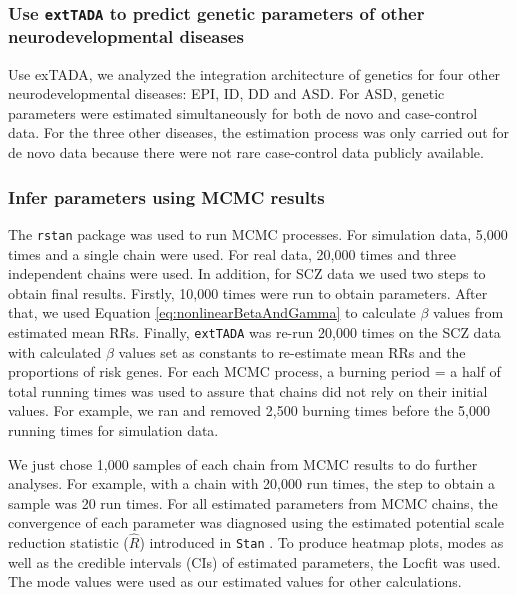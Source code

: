 \documentclass[]{article}
\begin{document}
\subsubsection{Use \texttt{extTADA} to predict genetic parameters of other  neurodevelopmental diseases}

Use exTADA, we analyzed the integration architecture of genetics for
four other  neurodevelopmental diseases: EPI, ID, DD and ASD. For ASD, genetic
parameters were estimated simultaneously for both de novo and
case-control data. For the three other diseases, the estimation
process was only carried out for de novo data because there were not
rare case-control data publicly available.

\subsubsection{Infer parameters using MCMC results}

The \texttt{rstan} package \citep{carpenter2015stan} was used to run MCMC processes. For
simulation data, 5,000 times and a single chain were used. For real
data, 20,000 times and three independent chains were used. In
addition, for SCZ data we used two steps to obtain final
results. Firstly, 10,000 times were run to obtain
parameters. After that, we used Equation
\ref{eq:nonlinearBetaAndGamma} to calculate $\beta$ values
from estimated mean RRs. Finally, \texttt{extTADA} was re-run 20,000 times on the SCZ data
with calculated $\beta$ values set as constants to re-estimate mean
RRs and the proportions of risk genes. For each MCMC process, a
burning period = a half of total running times was used to assure
that chains did not rely on their initial values. For example, we ran
and removed 2,500 burning times before the 5,000 running times for simulation data.

We just chose 1,000 samples of each chain from MCMC results to do
further analyses. For example, with a chain with 20,000 run times, the step to obtain a sample was 20 run times. For all
estimated parameters from MCMC chains, the convergence of each
parameter was diagnosed using the estimated potential
scale reduction statistic ($\hat{R}$) introduced in \texttt{Stan} \citep{carpenter2015stan}. To produce heatmap plots, modes as well as the credible intervals (CIs) of estimated parameters, the Locfit \citep{loader2007locfit} was used. The mode values were used as our estimated values for other calculations.
\end{document}
